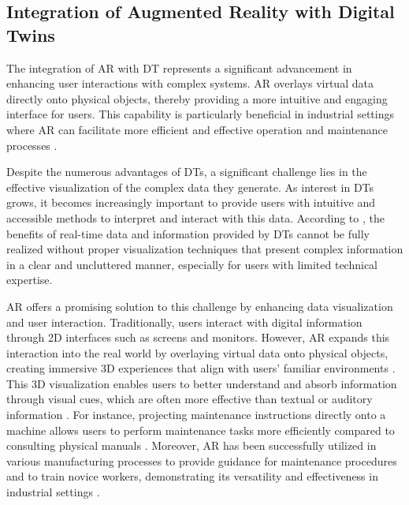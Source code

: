 





\subsection{Integration of Augmented Reality with Digital Twins}
The integration of \ac{AR} with \ac{DT} represents a significant advancement in enhancing user interactions with complex systems. 
\ac{AR} overlays virtual data directly onto physical objects, thereby providing a more intuitive and engaging interface for users. 
This capability is particularly beneficial in industrial settings where \ac{AR} can facilitate more efficient and effective operation and 
maintenance processes \cite{article12, peddie2017augmented}.

Despite the numerous advantages of \ac{DT}s, a significant challenge lies in the effective visualization of the complex data they generate. 
As interest in \ac{DT}s grows, it becomes increasingly important to provide users with intuitive and accessible methods to interpret and interact 
with this data. According to \cite{article12}, the benefits of real-time data and information provided by \ac{DT}s cannot be fully realized without 
proper visualization techniques that present complex information in a clear and uncluttered manner, especially for users with limited technical expertise.

\ac{AR} offers a promising solution to this challenge by enhancing data visualization and user interaction. Traditionally, users interact with digital 
information through 2D interfaces such as screens and monitors. However, \ac{AR} expands this interaction into the real world by overlaying virtual 
data onto physical objects, creating immersive 3D experiences that align with users' familiar environments \cite{peddie2017augmented}. This 3D visualization enables
users to better understand and absorb information through visual cues, which are often more effective than textual or auditory information \cite{article-teaching}.
For instance, projecting maintenance instructions directly onto a machine allows users to perform maintenance tasks more efficiently compared to 
consulting physical manuals \cite{inproceedings}. Moreover, \ac{AR} has been successfully utilized in various manufacturing processes to provide guidance 
for maintenance procedures and to train novice workers, demonstrating its versatility and effectiveness in industrial settings \cite{ong2004virtual}.

